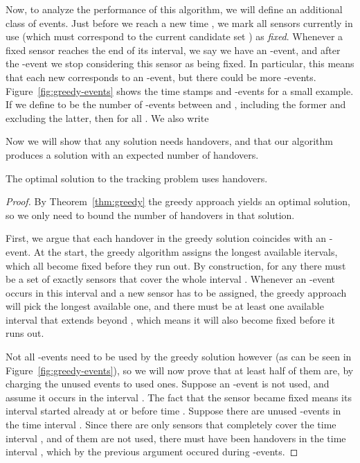 \documentclass[runningheads]{llncs}
\begin{document}
    Now, to analyze the performance of this algorithm, we will define an additional class of events. Just before we reach a new time , we mark all  sensors currently in use (which must correspond to the current candidate set ) as \emph {fixed}. Whenever a fixed sensor reaches the end of its interval, we say we have an -event, and after the -event we stop considering this sensor as being fixed. In particular, this means that each new  corresponds to an -event, but there could be more -events. Figure~\ref {fig:greedy-events} shows the time stamps and -events for a small example. If we define  to be the number of -events between  and , including the former and excluding the latter, then  for all . We also write 

    Now we will show that any solution needs  handovers, and that our algorithm produces a solution with  an expected number of  handovers.

    \begin {lemma}
      The optimal solution to the tracking problem uses  handovers.
    \end {lemma}

    \begin {proof}
      By Theorem~\ref {thm:greedy} the greedy approach yields an optimal solution, so we only need to bound the number of handovers in that solution. 

      First, we argue that each handover in the greedy solution coincides with an -event. At the start, the greedy algorithm assigns the  longest available itervals, which all become fixed before they run out.
      By construction, for any  there must be a set of exactly  sensors that cover the whole interval . Whenever an -event occurs in this interval and a new sensor has to be assigned, the greedy approach will pick the longest available one, and there must be at least one available interval that extends beyond , which means it will also become fixed before it runs out.

      Not all -events need to be used by the greedy solution however (as can be seen in Figure~\ref {fig:greedy-events}), so we will now prove that at least half of them are, by charging the unused events to used ones. Suppose an -event is not used, and assume it occurs in the interval . The fact that the sensor became fixed means its interval started already at or before time . Suppose there are  unused -events in the time interval . Since there are only  sensors that completely cover the time interval , and  of them are not used, there must have been  handovers in the time interval , which by the previous argument occured during -events.        
    \end {proof}
\end{document}
